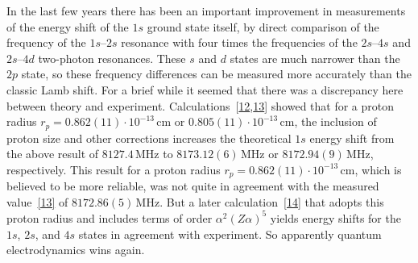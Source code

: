 In the last few years there has been an important improvement in measurements
of the energy shift of the $1s$ ground state itself, by direct comparison of
the frequency of the $1s$--$2s$ resonance with four times the frequencies of
the $2s$--$4s$ and $2s$--$4d$ two-photon resonances. These $s$ and $d$ states
are much narrower than the $2p$ state, so these frequency differences can be
measured more accurately than the classic Lamb shift. For a brief while it
seemed that there was a discrepancy here between theory and experiment.
Calculations~[\hyperlink{ref:14.12}{12},\hyperlink{ref:14.13}{13}] showed
that for a proton radius $r_p=0.862(11)\cdot10^{-13}\,\mathrm{cm}$ or
$0.805(11)\cdot10^{-13}\,\mathrm{cm}$, the inclusion of proton size and other
corrections increases the theoretical $1s$ energy shift from the above result
of $8127.4\,\mathrm{MHz}$ to $8173.12(6)\,\mathrm{MHz}$ or
$8172.94(9)\,\mathrm{MHz}$, respectively. This result for a proton radius
$r_p=0.862(11)\cdot10^{-13}\,\mathrm{cm}$, which is believed to be more
reliable, was not quite in agreement with the measured
value~\hyperlink{ref:14.13}{[13]} of $8172.86(5)\,\mathrm{MHz}$. But a later
calculation~\hyperlink{ref:14.14}{[14]} that adopts this proton radius and
includes terms of order $\alpha^2(Z\alpha)^5$ yields energy shifts for the
$1s$, $2s$, and $4s$ states in agreement with experiment. So apparently
quantum electrodynamics wins again.
